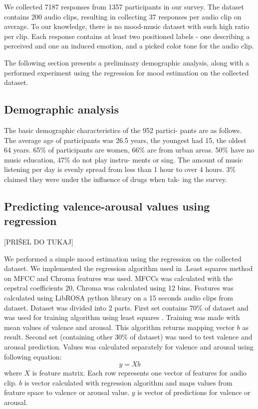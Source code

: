 \documentclass[a4paper]{article}
\begin{document}
We collected 7187 responses from 1357 participants in our survey. The dataset contains 200 audio clips, resulting in collecting 37 responses per audio clip on average. To our knowledge, there is no mood-music dataset with such high ratio per clip. Each response contains at least two positioned labels - one describing a perceived and one an induced emotion, and a picked color tone for the audio clip. 

The following section presents a preliminary demographic analysis, along with a performed experiment using the regression for mood estimation on the collected dataset.

\subsection{Demographic analysis}

The basic demographic characteristics of the 952 partici-
pants are as follows. The average age of participants was
26.5 years, the youngest had 15, the oldest 64 years. 65\%
of participants are women, 66\% are from urban areas.
50\% have no music education, 47\% do not play instru-
ments or sing. The amount of music listening per day is
evenly spread from less than 1 hour to over 4 hours. 3\%
claimed they were under the influence of drugs when tak-
ing the survey.

\subsection{Predicting valence-arousal values using regression}

[PRIŠEL DO TUKAJ]

We performed a simple mood estimation using the regression on the collected dataset. We implemented the regression algorithm used in \cite{schmidt2009projection}.Least squares method on MFCC \cite{logan2000mel} and Chroma \cite{bello2005robust} features was used. MFCCs was calculated with the cepstral coefficients 20, Chroma was calculated using 12 bins. Features was calculated using LibROSA python library on a 15 seconds audio clips from dataset. Dataset was divided into 2 parts. First set contains 70\% of dataset and was used for training algorithm using least squares \cite{abdi2007method}. Training was made with mean values of valence and arousal. This algorithm returns mapping vector $b$ as result. Second set (containing other 30\% of dataset) was used to test valence and arousal prediction. Values was calculated separately for valence and arousal using following equation: $$y = X b$$ where $X$ is feature matrix. Each row represents one vector of features for audio clip. $b$ is vector calculated with regression algorithm and maps values from feature space to valence or arousal value. $y$ is vector of predictions for valence or arousal. 
\end{document}
